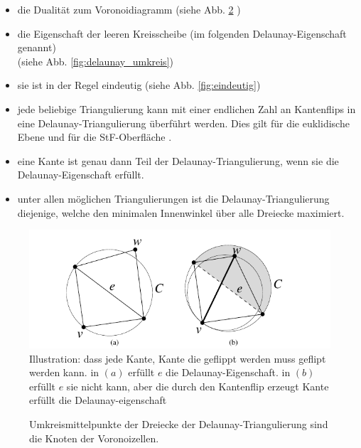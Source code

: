 \begin{itemize}
    \item die Dualität zum Voronoidiagramm (siehe Abb. \ref{fig:delaunay_voronoi}  ) \cite{indermitte:2001:voronoi,aurenhammer:2000:voronoi}
    \item die Eigenschaft der leeren Kreisscheibe (im folgenden Delaunay-Eigenschaft genannt)\\(siehe Abb. \ref{fig:delaunay_umkreis})
    \item sie ist in der Regel eindeutig (siehe Abb. \ref{fig:eindeutig})
    \item jede beliebige Triangulierung kann mit einer endlichen Zahl an Kantenflips in eine Delaunay-Triangulierung überführt werden. Dies gilt für die euklidische Ebene \cite{shewchuk:1997:delaunay} und für die StF-Oberfläche \cite{Bobenko:2007:LaplaceBeltrami}.
    \item eine Kante ist genau dann Teil der Delaunay-Triangulierung,  wenn sie die Delaunay-Eigenschaft erfüllt. 
    \item unter allen möglichen Triangulierungen ist die Delaunay-Triangulierung diejenige, welche den minimalen Innenwinkel über alle Dreiecke maximiert. 
\end{itemize}
 
 
 \begin{figure}[H]
    \centering
    \includegraphics[width=5in]{images/lokal_delaunay.png}
    \caption{Illustration: dass jede Kante, Kante die geflippt werden muss geflipt werden kann. in $(a)$ erfüllt $e$ die Delaunay-Eigenschaft. in $(b)$ erfüllt $e$ sie nicht kann, aber die durch den Kantenflip erzeugt Kante erfüllt die Delaunay-eigenschaft \cite{shewchuk:1997:delaunay} }
    \label{fig:lokal_delaunay}
\end{figure}


\begin{figure}[h]%
    \centering
  
  \caption{ Umkreismittelpunkte der Dreiecke der Delaunay-Triangulierung sind die Knoten  der Voronoizellen.\cite{Hferee:2011:delaunay-voronoi}}
  \label{fig:delaunay_voronoi}
\end{figure}


